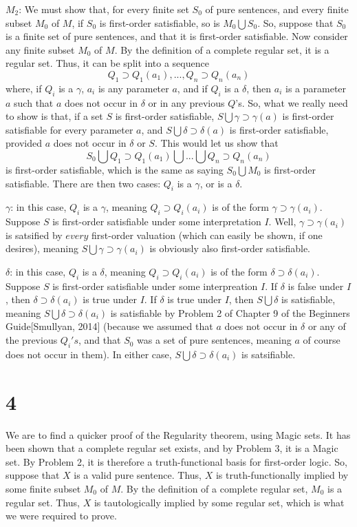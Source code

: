 \documentclass{article}
\theoremstyle{definition}
\begin{document}
$M_2$: We must show that, for every finite set $S_0$ of pure sentences, and every finite subset $M_0$ of $M$, if 
$S_0$ is first-order satisfiable, so is $M_0\bigcup S_0$. So, suppose that $S_0$ is a finite set of pure sentences, and 
that it is first-order satisfiable. Now consider any finite subset $M_0$ of $M$. By the definition of a complete regular set, it 
is a regular set. Thus, it can be split into a sequence
\[ Q_1\supset Q_1(a_1),...,Q_n\supset Q_n(a_n) \] where, if $Q_i$ is a $\gamma$, $a_i$ is any parameter $a$, and if $Q_i$ 
is a $\delta$, then $a_i$ is a parameter $a$ such that $a$ does not occur in $\delta$ or in any previous $Q$'s. So, what 
we really need to show is that, if a set $S$ is first-order satisfiable, 
$S\bigcup \gamma\supset\gamma(a)$ is first-order satisfiable for every 
parameter $a$, and $S\bigcup\delta\supset\delta(a)$ is first-order satisfiable, provided $a$ does not occur in $\delta$ or 
$S$. This would let us show that \[ S_0\bigcup Q_1\supset Q_1(a_1)\bigcup ...\bigcup Q_n\supset Q_n(a_n) \] is first-order 
satisfiable, which is the same as saying $S_0\bigcup M_0$ is first-order satisfiable. There are then two cases: $Q_i$ is a 
$\gamma$, or is a $\delta$.


$\gamma$: in this case, $Q_i$ is a $\gamma$, meaning $Q_i\supset Q_i(a_i)$ is of the form $\gamma\supset \gamma(a_i)$. 
Suppose $S$ is first-order satisfiable under some interpretation $I$. Well, $\gamma\supset\gamma(a_i)$ is satsified by $every$ 
first-order valuation (which can easily be shown, if one desires), meaning $S\bigcup\gamma\supset\gamma(a_i)$ is obviously 
also first-order satisfiable.


$\delta$: in this case, $Q_i$ is a $\delta$, meaning $Q_i\supset Q_i(a_i)$ is of the form $\delta\supset\delta(a_i)$. 
Suppose $S$ is first-order satisfiable under some interpreation $I$. If $\delta$ is false under $I$, then 
$\delta\supset\delta(a_i)$ is true under $I$. If $\delta$ is true under $I$, then $S\bigcup\delta$ is satisfiable, meaning 
$S\bigcup\delta\supset\delta(a_i)$ is satisfiable by Problem 2 of Chapter 9 of the Beginners Guide[Smullyan, 2014] (because we 
assumed that $a$ does not occur in $\delta$ or any of the previous $Q_i's$, and that $S_0$ was a set of pure sentences, 
meaning $a$ of course does not occur in them). In either 
case, $S\bigcup\delta\supset\delta(a_i)$ is satsifiable.

\section*{4}
We are to find a quicker proof of the Regularity theorem, using Magic sets. It has been shown that a complete regular set exists, 
and by Problem 3, it is a Magic set. By Problem 2, it is therefore a truth-functional basis for first-order logic. So, suppose 
that $X$ is a valid pure sentence. Thus, $X$ is truth-functionally implied by some finite subset $M_0$ of $M$. By the definition 
of a complete regular set, $M_0$ is a regular set. Thus, $X$ is tautologically implied by some regular set, which is what we 
were required to prove.  
\end{document}
